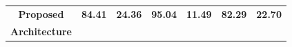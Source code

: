 \begin{table}
{\begin{tabular}{l|c|c|c|c|c|c|}
	\multicolumn{1}{|c|}{\textbf{Proposed}} & \multicolumn{1}{c|}{\textbf{84.41}} & \multicolumn{1}{|c|}{\textbf{24.36}} & \multicolumn{1}{c|}{\textbf{95.04}} & \multicolumn{1}{c|}{\textbf{11.49}} & \multicolumn{1}{c|}{\textbf{82.29}} & \multicolumn{1}{c|}{\textbf{22.70}} \\
	\multicolumn{1}{|c|}{\textbf{Architecture}} & \multicolumn{1}{l|}{} & \multicolumn{1}{l|}{} & \multicolumn{1}{l|}{} & \multicolumn{1}{l|}{} & \multicolumn{1}{l|}{} & \multicolumn{1}{l|}{} \\
	\hline
	\end{tabular}}
\end{table}
